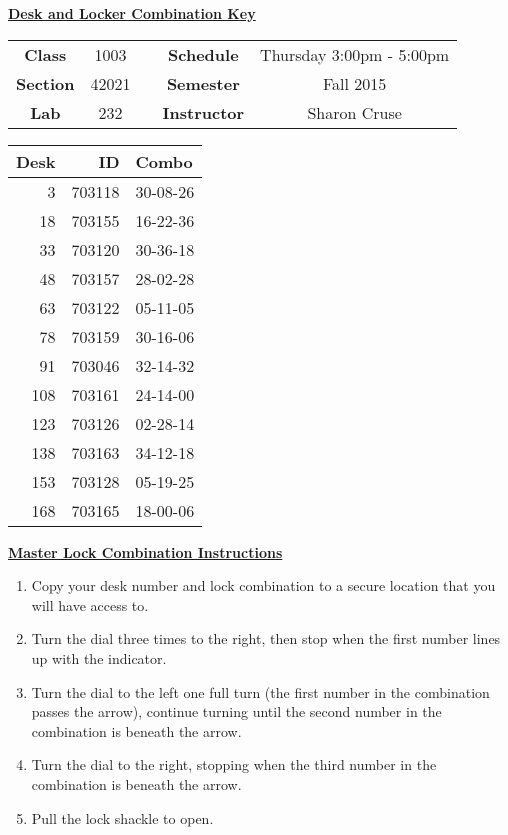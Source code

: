 \documentclass[12pt]{article}
\begin{document}
\thispagestyle{empty}

\begin{center}
	{\huge\textbf{\underline{ Desk and Locker Combination Key}}}
\end{center}


\begin{table}[h]
  \centering
  \begin{tabular}{ccccc}

  \textbf{Class} & 1003 & {\qquad} &\textbf{Schedule} & Thursday 3:00pm - 5:00pm \\
  \textbf{Section} & 42021 & {\qquad} & \textbf{Semester} & Fall 2015 \\
  \textbf{Lab} & 232 & {\qquad} & \textbf{Instructor} & Sharon Cruse \\
  \end{tabular}
\end{table}
 \vspace{0.5in}
\begin{minipage}{0.4\textwidth}

\begin{tabular}{rrl}
\toprule
 Desk &      ID &     Combo \\
\midrule
    3 &  703118 &  30-08-26 \\
   18 &  703155 &  16-22-36 \\
   33 &  703120 &  30-36-18 \\
   48 &  703157 &  28-02-28 \\
   63 &  703122 &  05-11-05 \\
   78 &  703159 &  30-16-06 \\
   91 &  703046 &  32-14-32 \\
  108 &  703161 &  24-14-00 \\
  123 &  703126 &  02-28-14 \\
  138 &  703163 &  34-12-18 \\
  153 &  703128 &  05-19-25 \\
  168 &  703165 &  18-00-06 \\
\bottomrule
\end{tabular}


\end{minipage}
\begin{minipage}{0.4\textwidth}
\underline{{\large \textbf{Master Lock Combination Instructions}}}
\begin{enumerate}
\item Copy your desk number and lock combination to a secure location that you will have access to.
\item Turn the dial three times to the right, then stop when the first number lines up with the indicator.
\item Turn the dial to the left one full turn (the first number in the combination passes the arrow), continue turning until the second number in the combination is beneath the arrow.
\item Turn the dial to the right, stopping when the third number in the combination is beneath the arrow.
\item Pull the lock shackle to open.
\end{enumerate}
\end{minipage}
\end{document}
